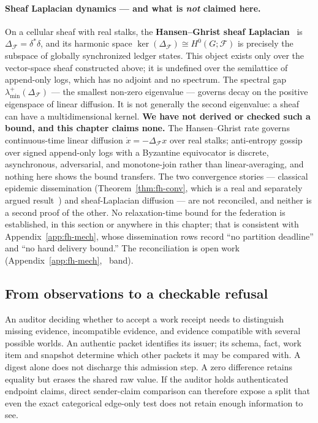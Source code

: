 \documentclass[11pt,a4paper]{article}
\theoremstyle{definition}
\theoremstyle{remark}
\begin{document}
\paragraph{Sheaf Laplacian dynamics --- and what is \emph{not} claimed here.} On a cellular sheaf with real stalks, the \textbf{Hansen--Ghrist sheaf Laplacian}~ is $\Delta_{\mathcal{F}} = \delta^* \delta$, and its harmonic space $\ker(\Delta_{\mathcal{F}}) \cong H^0(G; \mathcal{F})$ is precisely the subspace of globally synchronized ledger states. This object exists only over the vector-space sheaf constructed above; it is undefined over the semilattice of append-only logs, which has no adjoint and no spectrum. The spectral gap $\lambda_{\min}^{+}(\Delta_{\mathcal{F}})$ --- the smallest non-zero eigenvalue --- governs decay on the positive eigenspace of linear diffusion. It is not generally the second eigenvalue: a sheaf can have a multidimensional kernel. \textbf{We have not derived or checked such a bound, and this chapter claims none.} The Hansen--Ghrist rate governs continuous-time linear diffusion $\dot{x} = -\Delta_{\mathcal{F}}x$ over real stalks; anti-entropy gossip over signed append-only logs with a Byzantine equivocator is discrete, asynchronous, adversarial, and monotone-join rather than linear-averaging, and nothing here shows the bound transfers. The two convergence stories --- classical epidemic dissemination (Theorem~\ref{thm:fh-conv}, which is a real and separately argued result~) and sheaf-Laplacian diffusion --- are not reconciled, and neither is a second proof of the other. No relaxation-time bound for the federation is established, in this section or anywhere in this chapter; that is consistent with Appendix~\ref{app:fh-mech}, whose dissemination rows record ``no partition deadline'' and ``no hard delivery bound.'' The reconciliation is open work (Appendix~\ref{app:fh-mech}, \Open\ band).

\subsection{From observations to a checkable refusal}\label{sec:fh-evidence-decision}

An auditor deciding whether to accept a work receipt needs to distinguish
missing evidence, incompatible evidence, and evidence compatible with several
possible worlds. An authentic packet identifies its issuer; its schema, fact,
work item and snapshot determine which other packets it may be compared with.
A digest alone does not discharge this admission step.
A zero difference retains equality but erases the shared raw value. If the
auditor holds authenticated endpoint claims, direct sender-claim comparison
can therefore expose a split that even the exact categorical edge-only test
does not retain enough information to see.
\end{document}

